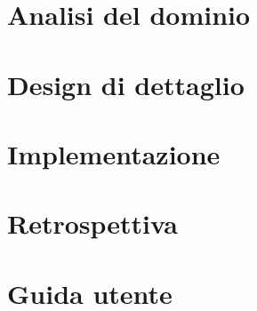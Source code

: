 \documentclass{article}
\begin{document}
\maketitle
\newpage
\tableofcontents
\newpage






\section{Analisi del dominio}

\section{Design di dettaglio} 
\section{Implementazione}
\section{Retrospettiva}
\section{Guida utente}

\newpage

\end{document}
